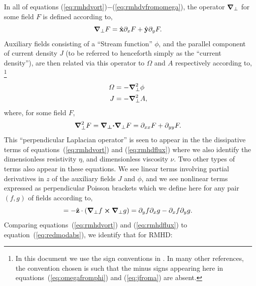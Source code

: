 \documentclass[12pt]{memoir}
\begin{document}
%
In all of equations (\ref{eq:rmhdvort})$-$(\ref{eq:rmhdvfromomega}), the operator
$\boldsymbol{\nabla}_\perp$ for some field $F$ is defined according to,
%
\begin{subequations}
\begin{equation}
  \boldsymbol{\nabla}_\perp F=\hat{\mathbf{x}}\partial_x F + \hat{\mathbf{y}}\partial_y F \label{eq:defdelperp}.
\end{equation}
\end{subequations}
%
Auxiliary fields consisting of a ``Stream function'' $\phi$, and
the parallel component of current density $J$ (to be referred to 
henceforth simply as the ``current density''), are then related 
via this operator to $\Omega$ and $A$ respectively according to,
\footnote{In this document we use the sign conventions in 
\citet{Longcope93}. In many other references, the convention
chosen is such that the minus signs appearing here in
equations~(\ref{eq:omegafromphi}) and (\ref{eq:jfroma})
are absent.}
%
\begin{subequations}
\begin{align}
  \Omega &=-\boldsymbol{\nabla}_\perp^2\phi  \label{eq:omegafromphi} \\
  J      &=-\boldsymbol{\nabla}_\perp^2 A,     \label{eq:jfroma}
\end{align}
\end{subequations}
%
where, for some field $F$, 
%
\begin{subequations}
\begin{equation}
  \boldsymbol{\nabla}_\perp^2 F=\boldsymbol{\nabla_\perp\cdot}\boldsymbol{\nabla}_\perp F=\partial_{xx} F + \partial_{yy} F. \label{eq:defdelperpsqd}
\end{equation}
\end{subequations}
%
This ``perpendicular Laplacian operator'' is seen to appear in the
the dissipative terms of equations~(\ref{eq:rmhdvort}) and
(\ref{eq:rmhdflux})  where we also identify the dimensionless
resistivity $\eta$, and dimensionless viscosity $\nu$.
%
Two other types of terms also appear in these equations. We see linear
terms involving partial derivatives in $z$ of the auxiliary fields
$J$ and $\phi$, and we see nonlinear terms expressed as perpendicular
Poisson brackets which we define here for any pair $(f,g)$ of
fields according to,
%
\begin{equation}
  [f,g] = -\zhat \cdot \left(\delperp f\cross\delperp g\right) = \pardy f\pardx g - \pardx f \pardy g.
  \label{eq:pbdef}
\end{equation}
%
Comparing equations~(\ref{eq:rmhdvort}) and (\ref{eq:rmhdflux}) to equation~(\ref{eq:redmodabs}),
            \label{eq:redmodabs}
we identify that for RMHD:
%
\end{document}
